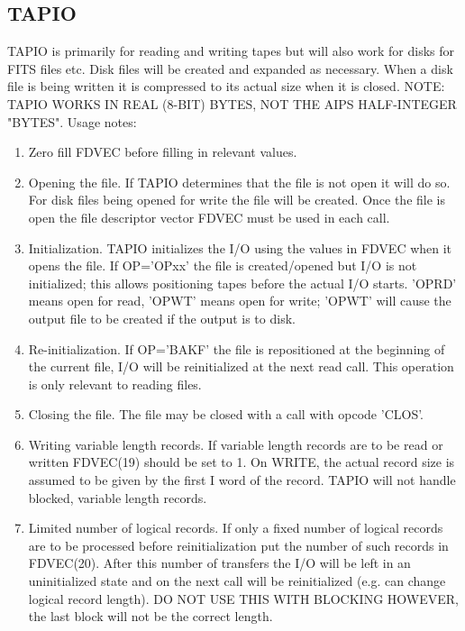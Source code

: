 \subsection{TAPIO}
TAPIO is primarily for reading and writing tapes but will also
work for disks for FITS files etc.  Disk files will be created and
expanded as necessary.  When a disk file is being written it is
compressed to its actual size when it is closed.
NOTE: TAPIO WORKS IN REAL (8-BIT) BYTES, NOT THE AIPS HALF-INTEGER
"BYTES".
Usage notes:\\
\begin{enumerate} %
\item
Zero fill FDVEC before filling in relevant values.
\item
Opening the file.  If TAPIO determines that the file is not
open it will do so.  For disk files being opened for write
the file will be created.  Once the file is open the file
descriptor vector FDVEC must be used in each call.
\item
Initialization.  TAPIO initializes the I/O using the values in
FDVEC when it opens the file.
If OP='OPxx' the file is created/opened but I/O is not
initialized; this allows positioning tapes before the actual
I/O starts. 'OPRD' means open for read, 'OPWT' means open for
write; 'OPWT' will cause the output file to be created if the
output is to disk.
\item
Re-initialization.  If OP='BAKF' the file is repositioned at
the beginning of the current file, I/O will be reinitialized at
the next read call.  This operation is only relevant to reading
files.
\item
Closing the file.  The file may be closed with a call with
opcode 'CLOS'.
\item
Writing variable length records.  If variable length records
are to be read or written FDVEC(19) should be set to 1.
On WRITE, the actual record size is assumed to be given by
the first I   word of the record.  TAPIO will not handle
blocked, variable length records.
\item
Limited number of logical records.  If only a fixed number of
logical records are to be processed before reinitialization
put the number of such records in FDVEC(20).  After this number
of transfers the I/O will be left in an uninitialized state and
on the next call will be reinitialized (e.g. can change logical
record length).  DO NOT USE THIS WITH BLOCKING HOWEVER, the
last block will not be the correct length.

\end{enumerate} %

